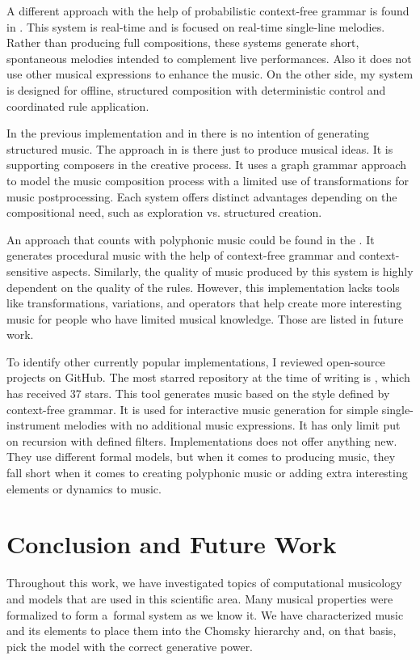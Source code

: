 A different approach with the help of probabilistic context-free grammar is found in \cite{gramimprovisation}. This system is real-time and is focused on real-time single-line melodies. Rather than producing full compositions, these systems generate short, spontaneous melodies intended to complement live performances. Also it does not use other musical expressions to enhance the music. On the other side, my system is designed for offline, structured composition with deterministic control and coordinated rule application. 

In the previous implementation and in \cite{melkonian_music_language} there is no intention of generating structured music. The approach in \cite{melkonian_music_language} is there just to produce musical ideas. It is supporting composers in the creative process. It uses a graph grammar approach to model the music composition process with a limited use of transformations for music postprocessing. Each system offers distinct advantages depending on the compositional need, such as exploration vs. structured creation.

An approach that counts with polyphonic music could be found in the \cite{eibensteiner2018procedural}. It generates procedural music with the help of context-free grammar and context-sensitive aspects. Similarly, the quality of music produced by this system is highly dependent on the quality of the rules. However, this implementation lacks tools like transformations, variations, and operators that help create more interesting music for people who have limited musical knowledge. Those are listed in future work.

To identify other currently popular implementations, I reviewed open-source projects on GitHub. The most starred repository at the time of writing is \cite{ave-llan_music_machine}, which has received 37 stars. This tool generates music based on the style defined by context-free grammar. It is used for interactive music generation for simple single-instrument melodies with no additional music expressions. It has only limit put on recursion with defined filters. Implementations \cite{halleyyoung_generative_grammar_music, kwon-young_music_notation_grammar} does not offer anything new. They use different formal models, but when it comes to producing music, they fall short when it comes to creating polyphonic music or adding extra interesting elements or dynamics to music. 

\chapter{Conclusion and Future Work}
Throughout this work, we have investigated topics of computational musicology and models that are used in this scientific area. Many musical properties were formalized to form a~formal system as we know it. We have characterized music and its elements to place them into the Chomsky hierarchy and, on that basis, pick the model with the correct generative power.  

